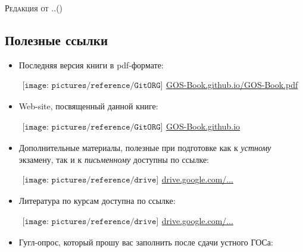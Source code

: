 {\LARGE\scshape Редакция от \twodigit\day.\twodigit\month.\the\year \;(\currenttime)}\par 

\vspace*{-1\baselineskip}  
\begin{flushleft}
\section*{\Large Полезные ссылки}
\begin{itemize}[wide, labelwidth=!, labelindent=0pt, label=$\blacktriangleright$, noitemsep]
\item Последняя версия книги в pdf-формате:

\qquad\href{https://GOS-Book.github.io/GOS-Book.pdf}{$
\begin{array}{l}
\texttt{[image: pictures/reference/GitORG]}
\end{array}
$\large GOS-Book.github.io/GOS-Book.pdf}

\item Web-site, посвященный данной книге:

\qquad\href{https://GOS-Book.github.io/}{$
\begin{array}{l}
\texttt{[image: pictures/reference/GitORG]}
\end{array}
$\large GOS-Book.github.io}

\item Дополнительные материалы, полезные при подготовке как к \textit{устному} экзамену, так и к \textit{письменному} доступны по ссылке:

\qquad\href{https://drive.google.com/drive/folders/1Ym2YlMolK29P_HCivUknmSfM9WQFJFxO?usp=sharing}{$
\begin{array}{l}
\texttt{[image: pictures/reference/drive]}
\end{array}
$\large drive.google.com/...}

\item Литература по курсам доступна по ссылке:

\qquad\href{https://drive.google.com/drive/folders/1_p482-Unjn7W-VujTtCWgMSijh9bfYip?usp=sharing}{$
\begin{array}{l}
\texttt{[image: pictures/reference/drive]}
\end{array}
$\large drive.google.com/...}

\item Гугл-опрос, который прошу вас заполнить после сдачи устного ГОСа:


\end{itemize}
\end{flushleft}
